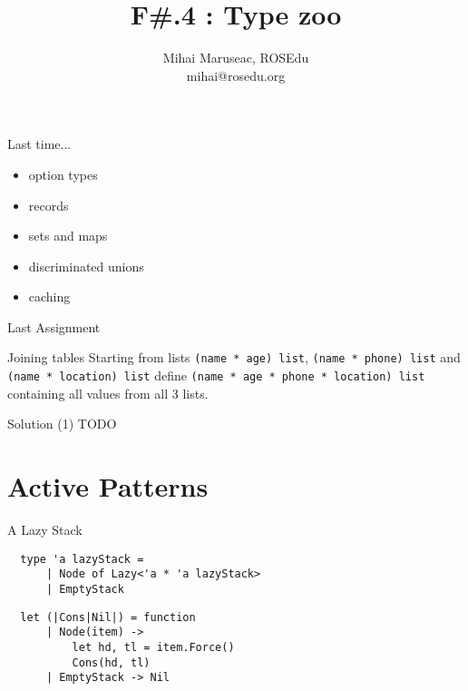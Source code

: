 \documentclass{beamer}
\title{F\#.4 : Type zoo}
\author{Mihai Maruseac, ROSEdu\\mihai@rosedu.org}
\begin{document}
\maketitle

\begin{frame}
  \tableofcontents
\end{frame}

\begin{frame}{Last time...}
  \begin{itemize}[<+->]
    \item option types
    \item records
    \item sets and maps
    \item discriminated unions
    \item caching
  \end{itemize}
\end{frame}

\begin{frame}{Last Assignment}
  \begin{block}{Joining tables}
  Starting from lists \texttt{(name * age) list}, \texttt{(name * phone) list}
and \texttt{(name * location) list} define \texttt{(name * age * phone *
location) list} containing all values from all 3 lists.
  \end{block}
\end{frame}

\begin{frame}[fragile]{Solution (1)}
  TODO
\end{frame}

\section{Active Patterns}
\frame{\tableofcontents[currentsection]}

\begin{frame}[fragile]{A Lazy Stack}
  \begin{verbatim}
  type 'a lazyStack =
      | Node of Lazy<'a * 'a lazyStack>
      | EmptyStack
  \end{verbatim}
  \begin{verbatim}
  let (|Cons|Nil|) = function
      | Node(item) ->
          let hd, tl = item.Force()
          Cons(hd, tl)
      | EmptyStack -> Nil
  \end{verbatim}
\end{frame}
\end{document}
